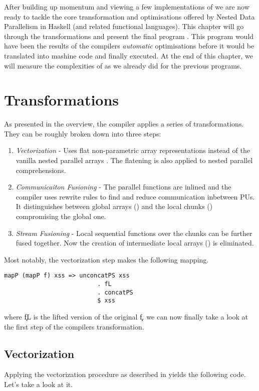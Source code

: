 \label{chapter:ndpv}

After building up momentum and viewing a few implementations of \algo
we are now ready to tackle the core transformation and optimisations
offered by Nested Data Parallelism in Haskell (and related functional languages).
This chapter will go through the transformations and present the
final program \ndpv. This program would have been the results of the compilers \textit{automatic}
optimisations before it would be translated into mashine code and finally executed.
At the end of this chapter, we will measure the complexities of \ndpv as we already did for the previous programs.

\section{Transformations}
  As presented in the overview, the compiler applies a series of transformations. They can be
  roughly broken down into three steps:
  \begin{enumerate}
    \item \emph{Vectorization} - Uses flat non-parametric array \pav representations instead of the
          vanilla nested parallel arrays \pan . The flatening is also applied to nested parallel comprehensions.
    \item \emph{Communicaiton Fusioning} - The parallel functions are inlined and the compiler uses rewrite rules to
          find and reduce communication inbetween PUs. It distinguishes between global arrays (\pav) and the local chunks (\pad)
          compromising the global one.
    \item \emph{Stream Fusioning} - Local sequential functions over the chunks can be further fused together. Now
          the creation of intermediate local arrays (\pad) is eliminated.
  \end{enumerate}
  
  Most notably, the vectorization step makes the following mapping.
  \begin{lstlisting}
mapP (mapP f) xss => unconcatPS xss
                          . fL
                          . concatPS
                          $ xss
  \end{lstlisting} %
  where \c{fL} is the lifted version of the original \c{f}.
  we can now finally take a look at the first step of the compilers transformation.
  
  \subsection{Vectorization}
    Applying the vectorization procedure as described in \cite{Harness2008} yields the following code. Let's take a look  at it.
    
